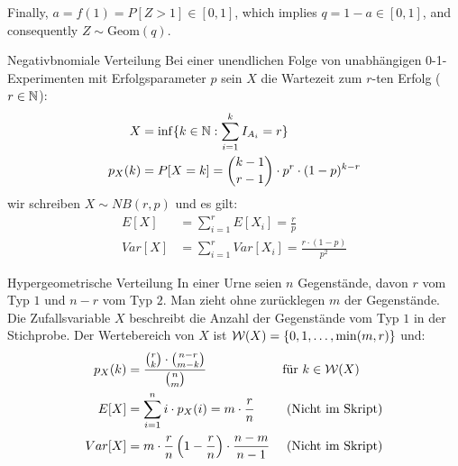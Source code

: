 Finally, $a = f(1) = P[Z > 1] \in [0, 1]$, which implies $q = 1 - a \in [0, 1]$, and consequently $Z \sim \text{Geom}(q)$.
\BoxEnd{}
\begin{definition}{Negativbnomiale Verteilung}
  Bei einer unendlichen Folge von unabhängigen 0-1-Experimenten mit
  Erfolgsparameter $p$ sein $X$ die Wartezeit zum $r$-ten Erfolg ($r \in \mathbb{N}$):
  \begin{align*}
    X       & = \inf \{ k \in \mathbb{N} : \sum_{i = 1}^k I_{A_i} = r \}         \\
    p_X (k) & = P[X = k] = \binom{k-1}{r-1} \cdot p^r \cdot  (1-p)^{k-r}
  \end{align*}
  wir schreiben $X \sim NB (r, p)$ und es gilt:
  \begin{align*}
    E[X]   & = \sum_{i = 1}^r E[X_i] = \frac{r}{p}                  \\
    Var[X] & = \sum_{i = 1}^r Var[X_i] = \frac{r \cdot  (1-p)}{p^2}
  \end{align*}
\end{definition}
\begin{definition}{Hypergeometrische Verteilung}
  In einer Urne seien $n$ Gegenstände, davon $r$ vom Typ $1$ und $n-r$ vom Typ
  $2$. Man zieht ohne zurücklegen $m$ der Gegenstände. Die Zufallsvariable $X$
  beschreibt die Anzahl der Gegenstände vom Typ $1$ in der Stichprobe. Der
  Wertebereich von $X$ ist $\mathcal{W} (X) = \{0, 1, \dots, \min (m, r)\}$ und:
  \begin{align*}
    p_X (k) & = \frac{\binom{r}{k} \cdot \binom{n-r}{m-k}}{\binom{n}{m}}
            &                                                                               & \text{für } k \in \mathcal{W} (X)                             \\
    E[X]    & = \sum_{i = 1}^n i \cdot p_X (i) = m \cdot \frac{r}{n}                                   &                          & \text{ (Nicht im Skript)} \\
    Var[X]  & = m \cdot \frac{r}{n} \left(1 - \frac{r}{n} \right) \cdot \frac{n - m}{n - 1} &                          & \text{ (Nicht im Skript)}
  \end{align*}
\end{definition}
